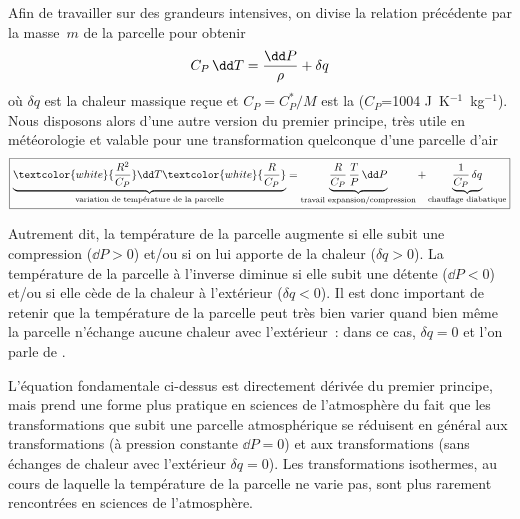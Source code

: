 \sk
Afin de travailler sur des grandeurs intensives, on divise la relation précédente par la masse~$m$ de la parcelle pour obtenir
\[ \EE \]
où $\delta q$ est la chaleur massique reçue et $C_P = C_P^* / M$ est la  ($C_P$=1004 J~K$^{-1}$~kg$^{-1}$). Nous disposons alors d'une autre version du premier principe, très utile en météorologie et valable pour une transformation quelconque d'une parcelle d'air
\[ \boxed{ \underbrace{\textcolor{white}{\frac{R^2}{C_P}} \dd T \textcolor{white}{\frac{R}{C_P}}}_{\text{variation de température de la parcelle}} = \underbrace{\frac{R}{C_P} \, \frac{T}{P} \, \dd P}_{\text{travail expansion/compression}} + \underbrace{\frac{1}{C_P} \, \delta q}_{\text{chauffage diabatique}} } \]

\sk
Autrement dit, la température de la parcelle augmente si elle subit une compression ($\dd P > 0$) et/ou si on lui apporte de la chaleur ($\delta q > 0$). La température de la parcelle à l'inverse diminue si elle subit une détente ($\dd P < 0$) et/ou si elle cède de la chaleur à l'extérieur ($\delta q < 0$). Il est donc important de retenir que la température de la parcelle peut très bien varier quand bien même la parcelle n'échange aucune chaleur avec l'extérieur~: dans ce cas, $\delta q = 0$ et l'on parle de . 

\sk
L'équation fondamentale ci-dessus est directement dérivée du premier principe, mais prend une forme plus pratique en sciences de l'atmosphère du fait que les transformations que subit une parcelle atmosphérique se réduisent en général aux transformations  (à pression constante $\dd P = 0$) et aux transformations  (sans échanges de chaleur avec l'extérieur $\delta q = 0$). Les transformations isothermes, au cours de laquelle la température de la parcelle ne varie pas, sont plus rarement rencontrées en sciences de l'atmosphère.


